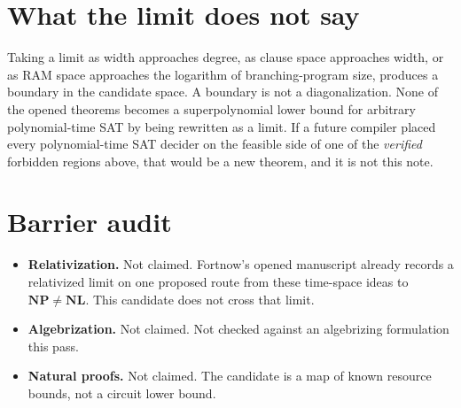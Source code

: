 \documentclass[11pt]{article}
\begin{document}
\section*{What the limit does not say}
Taking a limit as width approaches degree, as clause space approaches width, or as RAM space approaches the logarithm of branching-program size, produces a boundary in the candidate space. A boundary is not a diagonalization. None of the opened theorems becomes a superpolynomial lower bound for arbitrary polynomial-time SAT by being rewritten as a limit. If a future compiler placed every polynomial-time SAT decider on the feasible side of one of the \emph{verified} forbidden regions above, that would be a new theorem, and it is not this note.

\section*{Barrier audit}
\begin{itemize}
\item \textbf{Relativization.} Not claimed. Fortnow's opened manuscript already records a relativized limit on one proposed route from these time-space ideas to \(\mathbf{NP}\ne\mathbf{NL}\). This candidate does not cross that limit.
\item \textbf{Algebrization.} Not claimed. Not checked against an algebrizing formulation this pass.
\item \textbf{Natural proofs.} Not claimed. The candidate is a map of known resource bounds, not a circuit lower bound.
\end{itemize}
\end{document}
